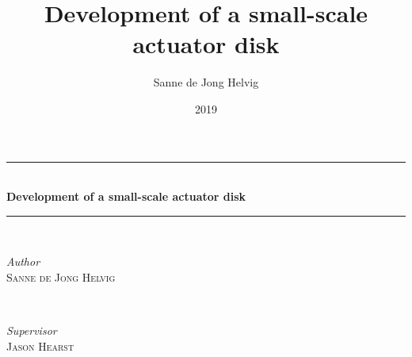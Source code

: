 \documentclass[pdftex,10pt,b5paper,twoside]{book}
\title{Development of a small-scale actuator disk}
\author{Sanne de Jong Helvig}
\date{2019}
\begin{document}
\begin{titlepage} %
	\newcommand{\HRule}{\rule{\linewidth}{0.5mm}} %
	
	\center %
	
	
	
	
	
	
	\HRule\\[0.4cm]
	
	{\huge\bfseries 
	{
	Development of a small-scale actuator disk}\\[0.4cm] %
	}
	
	\HRule\\[1.5cm]
	
	
	\begin{minipage}{0.4\textwidth}
		\begin{flushleft}
			\large
			\textit{Author}\\
			\textsc{Sanne de Jong Helvig} %
		\end{flushleft}
	\end{minipage}
	~
	\begin{minipage}{0.4\textwidth}
		\begin{flushright}
			\large
			\textit{Supervisor}\\
			\textsc{Jason Hearst}\\ %
		\end{flushright}
	\end{minipage}
	

\end{titlepage}
\end{document}
